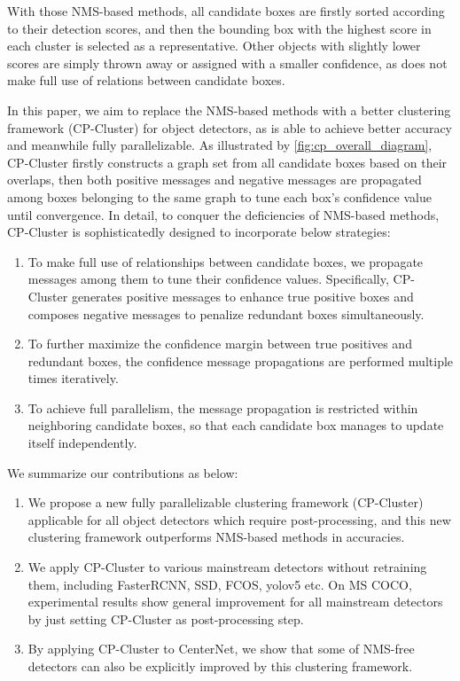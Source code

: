 \documentclass[10pt,twocolumn,letterpaper]{article}
\begin{document}
With those NMS-based methods, all candidate boxes are firstly sorted according to their detection scores, and then the bounding box with the highest score in each cluster is selected as a representative.
Other objects with slightly lower scores are simply thrown away or assigned with a smaller confidence, as does not make full use of relations between candidate boxes.

In this paper, we aim to replace the NMS-based methods with a better clustering framework (CP-Cluster) for object detectors, as is able to achieve better accuracy and meanwhile fully parallelizable.
As illustrated by \cref{fig:cp_overall_diagram}, CP-Cluster firstly constructs a graph set from all candidate boxes based on their overlaps, then both positive messages and negative messages are propagated among boxes belonging to the same graph to tune each box's confidence value until convergence.
In detail, to conquer the deficiencies of NMS-based methods, CP-Cluster is sophisticatedly designed to incorporate below strategies:
\begin{enumerate}[1)]
  \item To make full use of relationships between candidate boxes, we propagate messages among them to tune their confidence values. Specifically, CP-Cluster generates positive messages to enhance true positive boxes and composes negative messages to penalize redundant boxes simultaneously.
  \item To further maximize the confidence margin between true positives and redundant boxes, the confidence message propagations are performed multiple times iteratively.
  \item To achieve full parallelism, the message propagation is restricted within neighboring candidate boxes, so that each candidate box manages to update itself independently.
\end{enumerate}
We summarize our contributions as below:
\begin{enumerate}[1)]
  \item We propose a new fully parallelizable clustering framework (CP-Cluster) applicable for all object detectors which require post-processing, and this new clustering framework outperforms NMS-based methods in accuracies.
  \item We apply CP-Cluster to various mainstream detectors without retraining them, including FasterRCNN\cite{ren2015faster}, SSD\cite{liu2016ssd}, FCOS\cite{tian2019fcos}, yolov5\cite{21yolov5} etc. On MS COCO, experimental results show general improvement for all mainstream detectors by just setting CP-Cluster as post-processing step.
  \item By applying CP-Cluster to CenterNet\cite{zhou2019objects}, we show that some of NMS-free detectors can also be explicitly improved by this clustering framework.
\end{enumerate}
\end{document}

